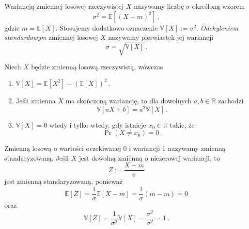 \documentclass{myclass}
\numberwithin{equation}{subsection}
\begin{document}
\begin{definition}
Wariancją zmiennej losowej rzeczywistej \(X\) nazywamy liczbę \(\sigma\) określoną wzorem
\begin{equation*}
    \sigma^2 = \mathbb{E}[(X - m)^2]\,,
\end{equation*} 
gdzie \(m = \mathbb{E}[X]\). Stosujemy dodatkowo oznaczenie \(\mathbb{V}[X] := \sigma^2\).
\emph{Odchyleniem standardowym} zmiennej losowej \(X\) nazywamy pierwiastek jej wariancji
\begin{equation*}
    \sigma = \sqrt{\mathbb{V}[X]}\,.
\end{equation*} 
\end{definition}

\begin{theorem}
Niech \(X\) będzie zmienną losową rzeczywistą, wówczas
\begin{enumerate}
    
    \item \(\mathbb{V}[X] = \mathbb{E}[X^2] - (\mathbb{E}[X])^2\)\,.

    \item Jeśli zmienna \(X\) ma skończoną wariancję, to dla dowolnych \(a,b \in \mathbb{R}\)
    zachodzi
    \begin{equation*}
        \mathbb{V}[aX + b] = a^2 \mathbb{V}[X]\,.
    \end{equation*}

    \item \(\mathbb{V}[X] = 0\) wtedy i tylko wtedy, gdy istnieje \(x_0 \in \mathbb{R}\) takie, że
    \begin{equation*}
        \Pr(X \neq x_0) = 0\,.
    \end{equation*}

\end{enumerate}
\end{theorem}

\begin{definition}
Zmienną losową o wartości oczekiwanej 0 i wariancji 1 nazywamy zmienną standaryzowaną. Jeśli \(X\)
jest dowolną zmienną o niezerowej wariancji, to
\begin{equation*}
    Z := \frac{X - m}{\sigma}
\end{equation*}
jest zmienną standaryzowaną, ponieważ
\begin{equation*}
    \mathbb{E}[Z] = \frac{1}{\sigma}\mathbb{E}[X - m] = \frac{1}{\sigma}(m - m) = 0
\end{equation*}
oraz
\begin{equation*}
    \mathbb{V}[Z] = \frac{1}{\sigma^2} \mathbb{V}[X] = \frac{\sigma^2}{\sigma^2} = 1\,.
\end{equation*}
\end{definition}
\end{document}
